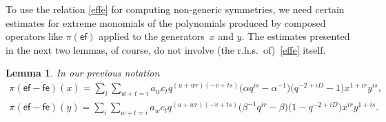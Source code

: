 \documentclass[10pt,a4paper]{amsart}
\numberwithin{equation}{section}
\newtheorem{Lemma}[Theorem]{Lemma}
\begin{document}
To use the relation \eqref{effe} for computing non-generic symmetries, we need certain estimates for extreme monomials of the polynomials produced by composed operators like $\pi(\mathsf{ef})$ applied to the generators~$x$ and $y$. The estimates presented in the next two lemmas, of course, do not involve (the r.h.s.\ of)~\eqref{effe} itself.

\begin{Lemma}\label{ef-fe}
In our previous notation
\begin{gather}
\pi(\mathsf{ef-fe})(x) =\sum_i\sum_{w+t=i}a_wc_tq^{(u+wr)(-v+ts)} \big(\alpha q^{is}-\alpha^{-1}\big)\big(q^{-2+iD}-1\big)x^{1+ir}y^{is}, \label{(ef-fe)x}\\
 \pi(\mathsf{ef-fe})(y) =\sum_i\sum_{w+t=i}a_wc_tq^{(u+wr)(-v+ts)} \big(\beta^{-1}q^{ir}-\beta\big) \big(1-q^{-2+iD}\big)x^{ir}y^{1+is}. \label{(ef-fe)y}
\end{gather}
\end{Lemma}
\end{document}
